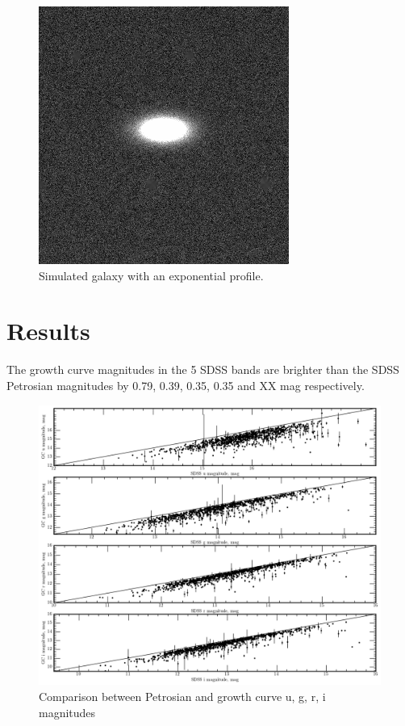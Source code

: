 \documentclass[apj, onecolumn]{emulateapj}
\begin{document}
\begin{figure}[h]
\centering
\includegraphics[scale=0.6]{img/test_expDisk}
\caption{Simulated galaxy with an exponential profile.}
\label{fig:test}
\end{figure}


\section*{Results}

The growth curve magnitudes in the 5 SDSS bands are brighter than the SDSS Petrosian magnitudes by 0.79, 0.39, 0.35, 0.35 and XX mag respectively. 

\begin{figure}[h]
\centering
\includegraphics[scale=0.5]{img/all_SDSS_vs_GC}
\caption{Comparison between Petrosian and growth curve u, g, r, i magnitudes}
\label{fig:app_mag_comparison}
\end{figure}
\end{document}
